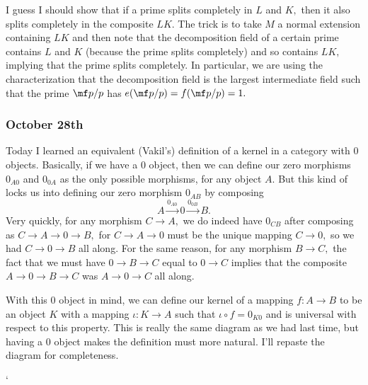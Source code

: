 I guess I should show that if a prime splits completely in $L$ and $K,$ then it also splits completely in the composite $LK.$ The trick is to take $M$ a normal extension containing $LK$ and then note that the decomposition field of a certain prime contains $L$ and $K$ (because the prime splits completely) and so contains $LK,$ implying that the prime splits completely. In particular, we are using the characterization that the decomposition field is the largest intermediate field such that the prime $\mf p/p$ has $e(\mf p/p)=f(\mf p/p)=1.$

\subsubsection{October 28th}
Today I learned an equivalent (Vakil's) definition of a kernel in a category with $0$ objects. Basically, if we have a $0$ object, then we can define our zero morphisms $0_{A0}$ and $0_{0A}$ as the only possible morphisms, for any object $A.$ But this kind of locks us into defining our zero morphism $0_{AB}$ by composing
\[A\stackrel{0_{A0}}\longrightarrow 0\stackrel{0_{0B}}\longrightarrow B.\]
Very quickly, for any morphism $C\to A,$ we do indeed have $0_{CB}$ after composing as $C\to A\to 0\to B,$ for $C\to A\to 0$ must be the unique mapping $C\to 0,$ so we had $C\to 0\to B$ all along. For the same reason, for any morphism $B\to C,$ the fact that we must have $0\to B\to C$ equal to $0\to C$ implies that the composite $A\to 0\to B\to C$ was $A\to 0\to C$ all along.

With this $0$ object in mind, we can define our kernel of a mapping $f:A\to B$ to be an object $K$ with a mapping $\iota:K\to A$ such that $\iota\circ f=0_{K0}$ and is universal with respect to this property. This is really the same diagram as we had last time, but having a $0$ object makes the definition must more natural. I'll repaste the diagram for completeness.
\begin{center}`
\end{center}


